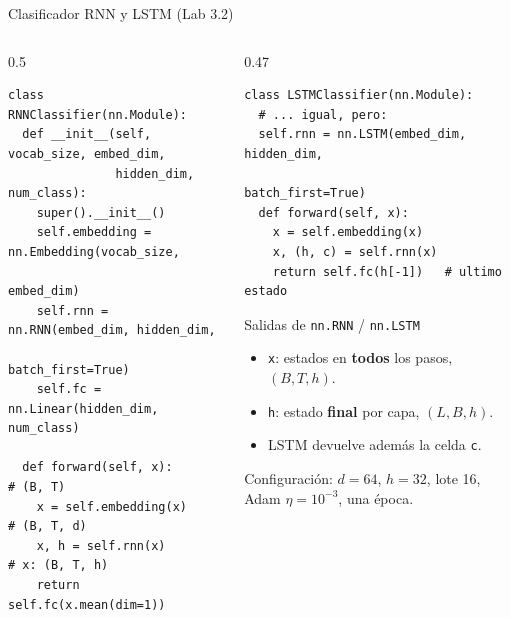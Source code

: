 \documentclass[aspectratio=169, 10pt]{beamer}
\begin{document}
\begin{frame}[fragile]{Clasificador RNN y LSTM (Lab 3.2)}

	\begin{columns}[T]
		\begin{column}{0.5\textwidth}
			\begin{tcolorbox}[codebox]
\scriptsize
\begin{verbatim}
class RNNClassifier(nn.Module):
  def __init__(self, vocab_size, embed_dim,
               hidden_dim, num_class):
    super().__init__()
    self.embedding = nn.Embedding(vocab_size,
                                  embed_dim)
    self.rnn = nn.RNN(embed_dim, hidden_dim,
                      batch_first=True)
    self.fc = nn.Linear(hidden_dim, num_class)

  def forward(self, x):         # (B, T)
    x = self.embedding(x)       # (B, T, d)
    x, h = self.rnn(x)          # x: (B, T, h)
    return self.fc(x.mean(dim=1))
\end{verbatim}
			\end{tcolorbox}
		\end{column}

		\begin{column}{0.47\textwidth}
			\begin{tcolorbox}[codebox]
\scriptsize
\begin{verbatim}
class LSTMClassifier(nn.Module):
  # ... igual, pero:
  self.rnn = nn.LSTM(embed_dim, hidden_dim,
                     batch_first=True)
  def forward(self, x):
    x = self.embedding(x)
    x, (h, c) = self.rnn(x)
    return self.fc(h[-1])   # ultimo estado
\end{verbatim}
			\end{tcolorbox}

			\begin{block}{Salidas de \texttt{nn.RNN} / \texttt{nn.LSTM}}
				\small
				\begin{itemize}
					\item \texttt{x}: estados en \textbf{todos} los pasos, $(B, T, h)$.
					\item \texttt{h}: estado \textbf{final} por capa, $(L, B, h)$.
					\item LSTM devuelve adem\'as la celda \texttt{c}.
				\end{itemize}
			\end{block}

			{\small Configuraci\'on: $d=64$, $h=32$, lote 16, Adam $\eta=10^{-3}$, una \'epoca.}
		\end{column}
	\end{columns}

\end{frame}
\end{document}
